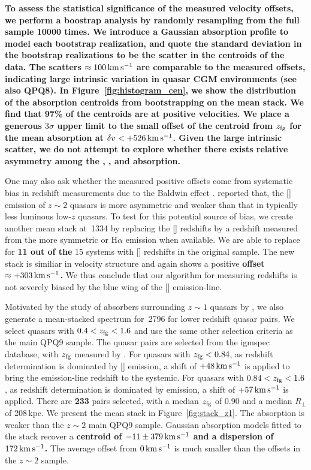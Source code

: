 \documentclass[iop]{emulateapj}
\begin{document}
{\bf To assess the statistical significance of the measured velocity offsets, we perform a boostrap analysis by
randomly resampling from the full sample 10000 times. We introduce a Gaussian absorption profile 
to model each bootstrap realization, and quote the standard deviation in the bootstrap 
realizations to be the scatter in the centroids of the data. The scatters 
$\approx100\,{\rm km\,s^{-1}}$ are comparable to the measured offsets, indicating large intrinsic 
variation in quasar CGM environments (see also QPQ8). In Figure~\ref{fig:histogram_cen}, we show 
the distribution of the absorption centroids from bootstrapping on the  mean stack. We 
find that {\bf 97\%} of the centroids are at positive velocities. We place a generous $3\sigma$ upper
limit to the small offset of the centroid from $z_{\rm fg}$ for the  mean absorption {\bf at
$\delta v<+526\,{\rm km\,s^{-1}}$.} Given the large intrinsic scatter, we do not attempt to explore
whether there exists relative asymmetry among the , , and  
absorption. 

One may also ask whether the measured positive offsets come from systematic bias in redshift 
measurements due to the Baldwin effect \citep{Baldwin77}. \cite{Shen16} reported that, the 
[] emission of $z\sim2$ quasars is more asymmetric and weaker than that in typically 
less luminous low-$z$ quasars. To test for this potential source of bias, we create another mean 
stack at \,1334 by replacing the [] redshifts by a redshift measured from the
more symmetric  or H$\alpha$ emission when available. We are able to replace for {\bf 11 out
of the} 15 systems with [] redshifts in the original sample. The new stack is similiar in
velocity structure and again shows a positive {\bf offset $\approx+303\,{\rm km\,s^{-1}}$.} We thus
conclude that our algorithm for measuring redshifts is not severely biased by the blue wing of the
[] emission-line.

Motivated by the study of  absorbers surrounding $z\sim1$ quasars by \cite{Johnson+15}, 
we also generate a mean-stacked spectrum for \,2796 for lower redshift quasar pairs.  
We select quasars with $0.4<z_{\rm fg}<1.6$ and use the same other selection criteria as the main 
QPQ9 sample. The quasar pairs are selected from the igmspec database, with $z_{\rm fg}$ measured 
by \cite{HewettWild10}. For quasars with $z_{\rm fg}<0.84$, as redshift determination is dominated 
by [] emission, a shift of $+48\,{\rm km\,s^{-1}}$ is applied to bring the emission-line 
redshift to the systemic. For quasars with $0.84<z_{\rm fg}<1.6$, as redshift determination is 
dominated by  emission, a shift of $+57\,{\rm km\,s^{-1}}$ is applied. There are {\bf 233}
pairs selected, with a median $z_{\rm fg}$ of 0.90 and a median $R_\perp$ of 208\,kpc. We present 
the mean stack in Figure~\ref{fig:stack_z1}. The absorption is weaker than the $z\sim2$ main QPQ9 
sample. Gaussian absorption models fitted to the stack recover a {\bf centroid of
$-11\pm379\,{\rm km\,s^{-1}}$ and a dispersion of $172\,{\rm km\,s^{-1}}$.} The average offset
from $0\,{\rm km\,s^{-1}}$ is much smaller than the offsets in the $z\sim2$ sample. 

}
\end{document}
